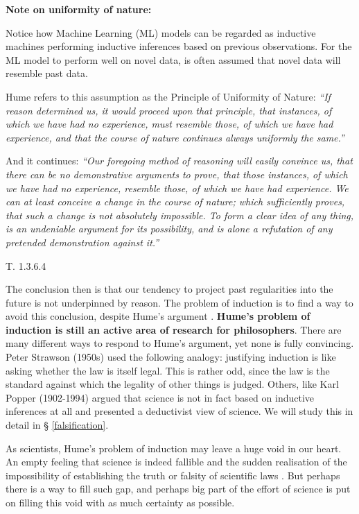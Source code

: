 \documentclass[
]{book}
\begin{document}
\begin{tipbox}

\textbf{Note on uniformity of nature:}

Notice how Machine Learning (ML) models can be regarded as inductive machines performing inductive inferences based on previous observations. For the ML model to perform well on novel data, is often assumed that novel data will resemble past data.

Hume refers to this assumption as the Principle of Uniformity of Nature: \emph{``If reason determined us, it would proceed upon that principle, that instances, of which we have had no experience, must resemble those, of which we have had experience, and that the course of nature continues always uniformly the same.''}

And it continues: \emph{``Our foregoing method of reasoning will easily convince us, that there can be no demonstrative arguments to prove, that those instances, of which we have had no experience, resemble those, of which we have had experience. We can at least conceive a change in the course of nature; which sufficiently proves, that such a change is not absolutely impossible. To form a clear idea of any thing, is an undeniable argument for its possibility, and is alone a refutation of any pretended demonstration against it.''}

\citep{hume1739treatise} T. 1.3.6.4

\end{tipbox}

The conclusion then is that our tendency to project past regularities into the future is not underpinned by reason. The problem of induction is to find a way to avoid this conclusion, despite Hume's argument \citep{sep-induction-problem}. \textbf{Hume's problem of induction is still an active area of research for philosophers}. There are many different ways to respond to Hume's argument, yet none is fully convincing. Peter Strawson (1950s) used the following analogy: justifying induction is like asking whether the law is itself legal. This is rather odd, since the law is the standard against which the legality of other things is judged. Others, like Karl Popper (1902-1994) argued that science is not in fact based on inductive inferences at all and presented a deductivist view of science. We will study this in detail in § \ref{falsification}.

As scientists, Hume's problem of induction may leave a huge void in our heart. An empty feeling that science is indeed fallible and the sudden realisation of the impossibility of establishing the truth or falsity of scientific laws \citep{rosenberg2019philosophy}. But perhaps there is a way to fill such gap, and perhaps big part of the effort of science is put on filling this void with as much certainty as possible.
\end{document}
